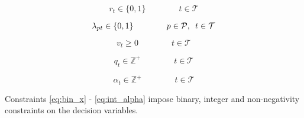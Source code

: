 \begin{equation} \label{eq:free_hit_bin_r}
    r_{t} \in \{0,1\} \qquad\qquad  t \in \mathcal{T}
\end{equation}

\begin{equation} \label{eq:auxiliary_variable_binary}
    \lambda_{pt} \in \{0,1\} \qquad\qquad p \in \mathcal{P}, \enskip t \in \mathcal{T}
\end{equation}

\begin{equation} \label{eq:nonn_v}
    v_{t} \geq 0 \qquad\qquad t \in \mathcal{T} 
\end{equation}

\begin{equation} \label{eq:int_q}
    q_{t} \in \mathbb{Z}^{+}  \qquad\qquad t \in \mathcal{T}
\end{equation}

\begin{equation} \label{eq:int_alpha}
    \alpha_{t} \in \mathbb{Z}^{+}  \qquad\qquad t \in \mathcal{T}
\end{equation}

Constraints \eqref{eq:bin_x} - \eqref{eq:int_alpha} impose binary, integer and non-negativity constraints on the decision variables.



